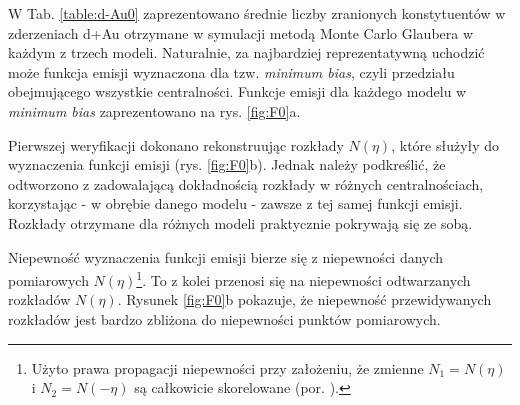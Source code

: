 \documentclass[a4paper,12pt]{article}
\begin{document}
W Tab. \ref{table:d-Au0} zaprezentowano średnie liczby zranionych konstytuentów w zderzeniach d+Au otrzymane w symulacji metodą Monte Carlo Glaubera w każdym z trzech modeli. Naturalnie, za najbardziej reprezentatywną uchodzić może funkcja emisji wyznaczona dla tzw. \textit{minimum bias}, czyli przedziału obejmującego wszystkie centralności. Funkcje emisji dla każdego modelu w \textit{minimum bias} zaprezentowano na rys. \ref{fig:F0}a.

Pierwszej weryfikacji dokonano rekonstruując rozkłady $N(\eta)$, które służyły do wyznaczenia funkcji emisji (rys. \ref{fig:F0}b). Jednak należy podkreślić, że odtworzono z zadowalającą dokładnością rozkłady w różnych centralnościach, korzystając - w obrębie danego modelu - zawsze z tej samej funkcji emisji. Rozkłady otrzymane dla różnych modeli praktycznie pokrywają się ze sobą. 

Niepewność wyznaczenia funkcji emisji bierze się z niepewności danych pomiarowych $N(\eta)$\footnote{Użyto prawa propagacji niepewności przy założeniu, że zmienne $N_1 = N(\eta)$ i $N_2 = N(-\eta)$ są całkowicie skorelowane (por. \cite{Barej:pracaInz18}).}. To z kolei przenosi się na niepewności odtwarzanych rozkładów $N(\eta)$. Rysunek \ref{fig:F0}b pokazuje, że niepewność przewidywanych rozkładów jest bardzo zbliżona do niepewności punktów pomiarowych.
\end{document}
